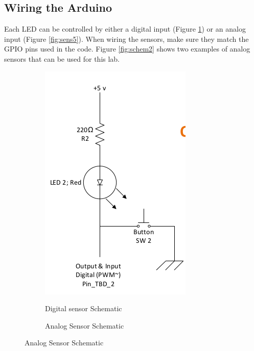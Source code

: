 \documentclass[12pt,letterpaper,oneside]{article}
\begin{document}
	\subsection{Wiring the Arduino} \label{sec:wire}
Each LED can be controlled by either a digital input (Figure \ref{fig:sens2}) or an analog input (Figure \ref{fig:sens5}). When wiring the sensors, make sure they match the GPIO pins used in the code. Figure \ref{fig:schem2} shows two examples of analog sensors that can be used for this lab.\bigskip
		\begin{figure}[here]
	        \centering
	        \caption{Sensor Schematics}\label{fig:schem1}
	        \begin{subfigure}[b]{0.4\textwidth}
                \caption{Digital sensor Schematic}
                \includegraphics[width=.75\textwidth]{images/circuit_2.png}
                \label{fig:sens2}
	        \end{subfigure}%
	        \begin{subfigure}[b]{0.4\textwidth}
                \caption{Analog Sensor Schematic}

\end{subfigure}
\end{figure}
\end{document}
